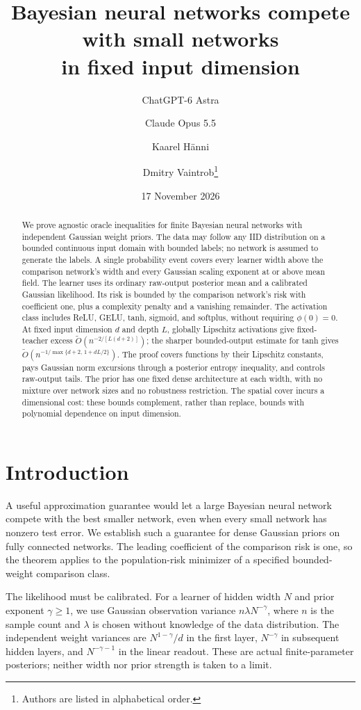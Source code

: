 \documentclass[11pt]{article}
\title{Bayesian neural networks compete with small networks\\in fixed input dimension}
\author{ChatGPT-6 Astra \and Claude Opus 5.5 \and Kaarel H\"anni \and Dmitry Vaintrob\thanks{Authors are listed in alphabetical order.}}
\date{17 November 2026}
\theoremstyle{definition}\newtheorem{definition}[theorem]{Definition}
\theoremstyle{remark}\newtheorem{remark}[theorem]{Remark}
\begin{document}
\maketitle
\begin{abstract}
We prove agnostic oracle inequalities for finite Bayesian neural networks
with independent Gaussian weight priors. The data may follow any IID
distribution on a bounded continuous input domain with bounded labels;
no network is assumed to generate the labels. A single probability event
covers every learner width above the comparison network's width and
every Gaussian scaling exponent at or above mean field. The learner
uses its ordinary raw-output posterior mean and a calibrated Gaussian
likelihood. Its risk is bounded by the comparison network's risk with
coefficient one, plus a complexity penalty and a vanishing remainder.
The activation class includes ReLU, GELU, tanh, sigmoid, and softplus,
without requiring $\phi(0)=0$. At fixed input dimension $d$ and depth
$L$, globally Lipschitz activations give fixed-teacher excess
$\widetilde O(n^{-2/[L(d+2)]})$; the sharper bounded-output estimate
for tanh gives
$\widetilde O(n^{-1/\max\{d+2,\,1+dL/2\}})$.
The proof covers functions by their Lipschitz constants, pays Gaussian
norm excursions through a posterior entropy inequality, and controls
raw-output tails. The prior has one fixed dense architecture at each
width, with no mixture over network sizes and no robustness restriction.
The spatial cover incurs a dimensional cost: these bounds complement,
rather than replace, bounds with polynomial dependence on input dimension.
\end{abstract}

\section{Introduction}
A useful approximation guarantee would let a large Bayesian neural
network compete with the best smaller network, even when every small
network has nonzero test error. We establish such a guarantee for dense
Gaussian priors on fully connected networks. The leading coefficient of
the comparison risk is one, so the theorem applies to the population-risk
minimizer of a specified bounded-weight comparison class.

The likelihood must be calibrated. For a learner of hidden width $N$
and prior exponent $\gamma\geq1$, we use Gaussian observation variance
$n\lambda N^{-\gamma}$, where $n$ is the sample count and $\lambda$
is chosen without knowledge of the data distribution. The independent
weight variances are $N^{1-\gamma}/d$ in the first layer,
$N^{-\gamma}$ in subsequent hidden layers, and $N^{-\gamma-1}$ in
the linear readout. These are actual finite-parameter posteriors;
neither width nor prior strength is taken to a limit.
\end{document}
